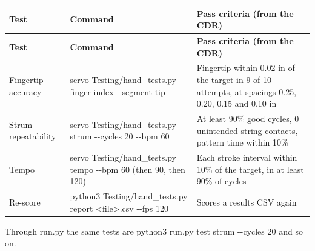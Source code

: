 \documentclass[11pt,letterpaper]{article}
\newcommand{\code}[1]{\textcolor{codeblue}{\ttfamily\smaller\relax #1}}
\begin{document}
{\small
\begin{longtable}{|>{\raggedright\arraybackslash}p{}|>{\raggedright\arraybackslash}p{}|>{\raggedright\arraybackslash}p{}|}
\hline
\rowcolor{tblhead}\textbf{Test} & \textbf{Command} & \textbf{Pass criteria (from the CDR)} \\ \hline
\endfirsthead
\hline
\rowcolor{tblhead}\textbf{Test} & \textbf{Command} & \textbf{Pass criteria (from the CDR)} \\ \hline
\endhead
Fingertip accuracy & \code{servo Testing/\allowbreak{}hand\_\allowbreak{}tests.py finger index -{}-{}segment tip} & Fingertip within \textpm{}0.02 in of the target in 9 of 10 attempts, at spacings 0.25, 0.20, 0.15 and 0.10 in \\ \hline
Strum repeatability & \code{servo Testing/\allowbreak{}hand\_\allowbreak{}tests.py strum -{}-{}cycles 20 -{}-{}bpm 60} & At least 90\% good cycles, 0 unintended string contacts, pattern time within 10\% \\ \hline
Tempo & \code{servo Testing/\allowbreak{}hand\_\allowbreak{}tests.py tempo -{}-{}bpm 60} (then 90, then 120) & Each stroke interval within \textpm{}10\% of the target, in at least 90\% of cycles \\ \hline
Re-score & \code{python3 Testing/\allowbreak{}hand\_\allowbreak{}tests.py report <file>.csv -{}-{}fps 120} & Scores a results CSV again \\ \hline
\end{longtable}}

Through \code{run.py} the same tests are \code{python3 run.py test strum -{}-{}cycles 20} and so on.
\end{document}
